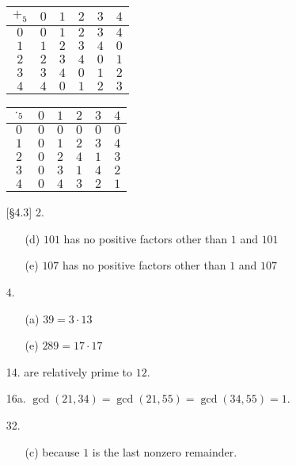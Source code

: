\documentclass{article}
\begin{document}
\begin{enumerate}
    \begin{tabular}{|c|rrrrr|}
    \hline
    $+_5$ & $0$ & $1$ & $2$ & $3$ & $4$ \\\hline
    $0$ & $0$ & $1$ & $2$ & $3$ & $4$ \\
    $1$ & $1$ & $2$ & $3$ & $4$ & $0$ \\
    $2$ & $2$ & $3$ & $4$ & $0$ & $1$ \\
    $3$ & $3$ & $4$ & $0$ & $1$ & $2$ \\
    $4$ & $4$ & $0$ & $1$ & $2$ & $3$ \\\hline
    \end{tabular} \qquad
    \begin{tabular}{|c|rrrrr|}
    \hline
    $\cdot_5$ & $0$ & $1$ & $2$ & $3$ & $4$ \\\hline
    $0$ & $0$ & $0$ & $0$ & $0$ & $0$ \\
    $1$ & $0$ & $1$ & $2$ & $3$ & $4$ \\
    $2$ & $0$ & $2$ & $4$ & $1$ & $3$ \\
    $3$ & $0$ & $3$ & $1$ & $4$ & $2$ \\
    $4$ & $0$ & $4$ & $3$ & $2$ & $1$ \\\hline
    \end{tabular}
    \item[{[\S 4.3]} 2.]
        \begin{itemize}
            \item[(d)]  $101$ has no positive factors other than $1$ and $101$
            \item[(e)]  $107$ has no positive factors other than $1$ and $107$
        \end{itemize}
    \item[4.]
        \begin{itemize}
            \item[(a)] $39 = 3 \cdot 13$
            \item[(e)] $289 = 17 \cdot 17$
        \end{itemize}
    \item[14.]  are relatively prime to $12$.
    \item[16a.]  $\gcd(21,34) = \gcd(21,55) = \gcd(34,55) = 1$.
    \item[32.]
        \begin{itemize}
            \item[(c)]  because $1$ is the last nonzero remainder.

\end{itemize}
\end{enumerate}
\end{document}
